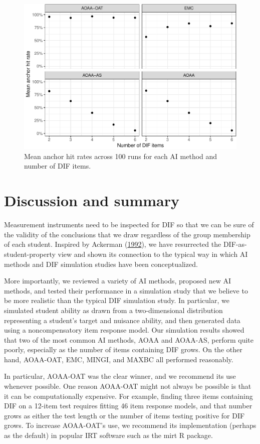\documentclass[
  11pt,
]{article}
\begin{document}
\begin{figure}[H]

{\centering \includegraphics[width=0.7\linewidth]{paper_files/figure-latex/anchorhit-1} 

}

\caption{Mean anchor hit rates across 100 runs for each AI method and number of DIF items.}\label{fig:anchorhit}
\end{figure}

\hypertarget{discussion-and-summary}{%
\section{Discussion and summary}\label{discussion-and-summary}}

Measurement instruments need to be inspected for DIF so that we can be sure of the validity of the conclusions that we draw regardless of the group membership of each student. Inspired by Ackerman (\protect\hyperlink{ref-ackerman1992didactic}{1992}), we have resurrected the DIF-as-student-property view and shown its connection to the typical way in which AI methods and DIF simulation studies have been conceptualized.

More importantly, we reviewed a variety of AI methods, proposed new AI methods, and tested their performance in a simulation study that we believe to be more realistic than the typical DIF simulation study. In particular, we simulated student ability as drawn from a two-dimensional distribution representing a student's target and nuisance ability, and then generated data using a noncompensatory item response model. Our simulation results showed that two of the most common AI methods, AOAA and AOAA-AS, perform quite poorly, especially as the number of items containing DIF grows. On the other hand, AOAA-OAT, EMC, MINGI, and MAXBC all performed reasonably.

In particular, AOAA-OAT was the clear winner, and we recommend its use whenever possible. One reason AOAA-OAT might not always be possible is that it can be computationally expensive. For example, finding three items containing DIF on a 12-item test requires fitting 46 item response models, and that number grows as either the test length or the number of items testing positive for DIF grows. To increase AOAA-OAT's use, we recommend its implementation (perhaps as the default) in popular IRT software such as the mirt R package.
\end{document}
